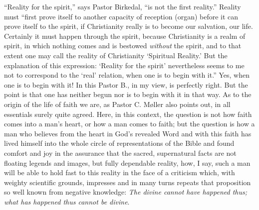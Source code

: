\documentclass[12pt,a4paper,openany]{book}
\newcommand{\opage}[1]{\marginnote{\footnotesize\textit{[#1]}}}
\begin{document}
``Reality for the spirit,'' says Pastor Birkedal, ``is
not the first reality.'' Reality must ``first
prove itself to another capacity of reception (organ) before it
can prove itself to the spirit, if Christianity really
is to become our salvation, our life. Certainly it must
happen through the spirit, because Christianity is a realm of spirit,
in which nothing comes and is bestowed \emph{without} the spirit, and
to that extent one may call the reality of Christianity
`Spiritual Reality.' But the explanation of this
expression: `Reality for the spirit' nevertheless seems to me
not to correspond to the `real' relation, when one is to
begin with it.'' Yes, when one is to begin with it!
In this Pastor B., in my view, is perfectly right.
\setcounter{footnote}{0}%
\opage{4}But the point is that one has neither begun nor
is to begin with it in that way. As to the origin of the life of faith we
are, as Pastor C. Møller also points out, in
all essentials surely quite agreed. Here, in this
context, the question is not how faith comes
into a man's heart, or how a man
comes to faith; but the question is how
a man who believes from the heart in God's revealed
Word and with this faith has lived himself into the whole
circle of representations of the Bible and found comfort and joy in the assurance
that the sacred, supernatural facts are not
floating legends and images, but fully dependable
reality, how, I say, such a man will
be able to hold fast to this reality in the face of
a criticism which, with weighty scientific grounds,
impresses and in many turns repeats that proposition so well known from
negative knowledge: \emph{The divine
cannot have happened thus; what
has happened thus cannot be divine}.
\end{document}
